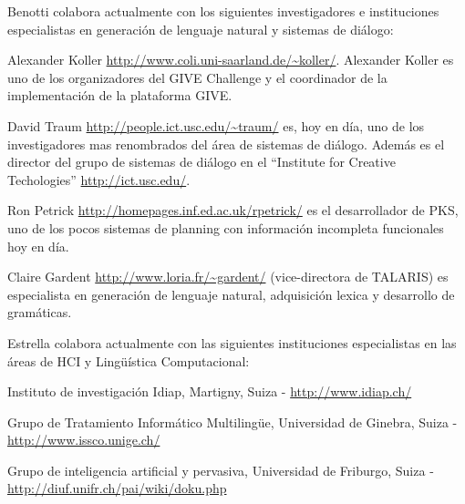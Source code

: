 Benotti colabora actualmente con los siguientes investigadores e instituciones
especialistas en generaci\'on de lenguaje natural y sistemas de di\'alogo:

\begin{myitemize}
\item Alexander Koller \url{http://www.coli.uni-saarland.de/~koller/}.
Alexander Koller es uno de los organizadores del GIVE Challenge y el
coordinador de la implementaci\'on de la plataforma GIVE. 

\item David Traum \url{http://people.ict.usc.edu/~traum/} es, hoy en d\'ia, uno
de los investigadores mas renombrados del \'area de sistemas de di\'alogo.
Adem\'as es el director del grupo de sistemas de di\'alogo en el ``Institute
for Creative Techologies'' \url{http://ict.usc.edu/}. 

\item Ron Petrick \url{http://homepages.inf.ed.ac.uk/rpetrick/} es el
desarrollador de PKS, uno de los pocos sistemas de planning con informaci\'on
incompleta funcionales hoy en d\'ia.

\item Claire Gardent \url{http://www.loria.fr/~gardent/} (vice-directora de
TALARIS) es especialista en generaci\'on de lenguaje natural, adquisici\'on
lexica y desarrollo de gram\'aticas.
\end{myitemize}

Estrella colabora actualmente con las siguientes instituciones especialistas en las \'areas de HCI y  Ling\"u\'istica Computacional:
\begin{myitemize}
    \item  Instituto de investigaci\'on Idiap, Martigny, Suiza -  \url{http://www.idiap.ch/}
\item Grupo de Tratamiento Inform\'atico Multiling\"ue, Universidad de Ginebra, Suiza - \url{http://www.issco.unige.ch/}
\item Grupo de inteligencia artificial y pervasiva, Universidad de Friburgo, Suiza - \url{http://diuf.unifr.ch/pai/wiki/doku.php}
\end{myitemize}

